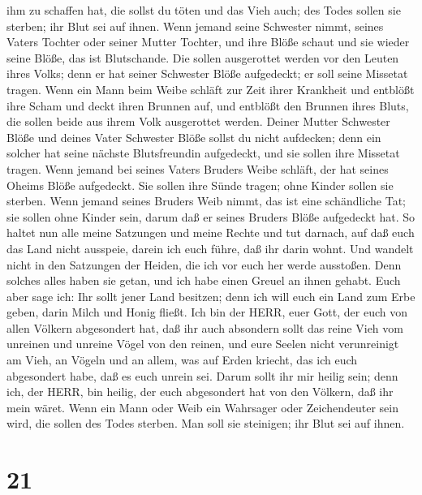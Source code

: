 ihm zu schaffen hat, die sollst du töten und das Vieh auch; des Todes
sollen sie sterben; ihr Blut sei auf ihnen.  Wenn jemand
seine Schwester nimmt, seines Vaters Tochter oder seiner Mutter Tochter,
und ihre Blöße schaut und sie wieder seine Blöße, das ist Blutschande.
Die sollen ausgerottet werden vor den Leuten ihres Volks; denn er hat
seiner Schwester Blöße aufgedeckt; er soll seine Missetat tragen.
 Wenn ein Mann beim Weibe schläft zur Zeit ihrer Krankheit
und entblößt ihre Scham und deckt ihren Brunnen auf, und entblößt den
Brunnen ihres Bluts, die sollen beide aus ihrem Volk ausgerottet werden.
 Deiner Mutter Schwester Blöße und deines Vater Schwester
Blöße sollst du nicht aufdecken; denn ein solcher hat seine nächste
Blutsfreundin aufgedeckt, und sie sollen ihre Missetat tragen.
 Wenn jemand bei seines Vaters Bruders Weibe schläft, der
hat seines Oheims Blöße aufgedeckt. Sie sollen ihre Sünde tragen; ohne
Kinder sollen sie sterben.  Wenn jemand seines Bruders Weib
nimmt, das ist eine schändliche Tat; sie sollen ohne Kinder sein, darum
daß er seines Bruders Blöße aufgedeckt hat.  So haltet nun
alle meine Satzungen und meine Rechte und tut darnach, auf daß euch das
Land nicht ausspeie, darein ich euch führe, daß ihr darin wohnt.
 Und wandelt nicht in den Satzungen der Heiden, die ich vor
euch her werde ausstoßen. Denn solches alles haben sie getan, und ich
habe einen Greuel an ihnen gehabt.  Euch aber sage ich: Ihr
sollt jener Land besitzen; denn ich will euch ein Land zum Erbe geben,
darin Milch und Honig fließt. Ich bin der HERR, euer Gott, der euch von
allen Völkern abgesondert hat,  daß ihr auch absondern
sollt das reine Vieh vom unreinen und unreine Vögel von den reinen, und
eure Seelen nicht verunreinigt am Vieh, an Vögeln und an allem, was auf
Erden kriecht, das ich euch abgesondert habe, daß es euch unrein sei.
 Darum sollt ihr mir heilig sein; denn ich, der HERR, bin
heilig, der euch abgesondert hat von den Völkern, daß ihr mein wäret.
 Wenn ein Mann oder Weib ein Wahrsager oder Zeichendeuter
sein wird, die sollen des Todes sterben. Man soll sie steinigen; ihr
Blut sei auf ihnen.

\hypertarget{section-20}{%
\section{21}\label{section-20}}

